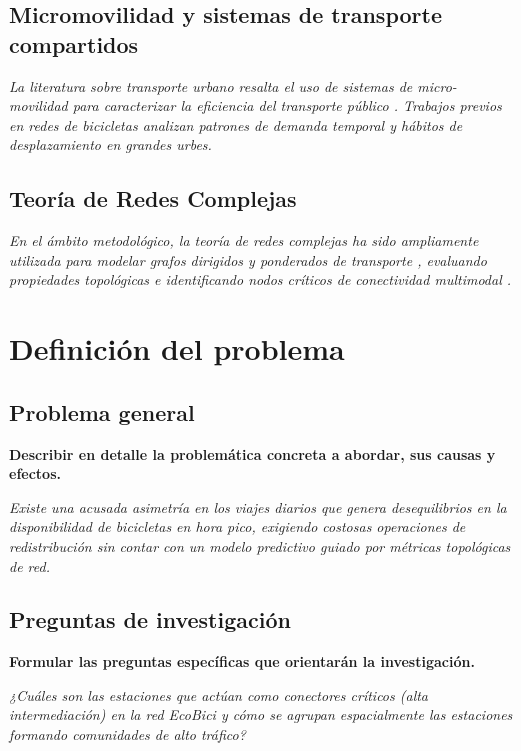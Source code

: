 \documentclass[12pt, a4paper]{article}
\begin{document}
\subsection{Micromovilidad y sistemas de transporte compartidos}
\noindent \textit{La literatura sobre transporte urbano resalta el uso de sistemas de micro-movilidad para caracterizar la eficiencia del transporte público \cite{gonzalez2022ecobici}. Trabajos previos en redes de bicicletas analizan patrones de demanda temporal y hábitos de desplazamiento en grandes urbes.}

\subsection{Teoría de Redes Complejas}
\noindent \textit{En el ámbito metodológico, la teoría de redes complejas ha sido ampliamente utilizada para modelar grafos dirigidos y ponderados de transporte \cite{newman2018networks}, evaluando propiedades topológicas e identificando nodos críticos de conectividad multimodal \cite{rodriguez2021complex}.}

\section{Definición del problema}

\subsection{Problema general}
\textbf{Describir en detalle la problemática concreta a abordar, sus causas y efectos.}

\vspace{0.2cm}
\noindent \textit{Existe una acusada asimetría en los viajes diarios que genera desequilibrios en la disponibilidad de bicicletas en hora pico, exigiendo costosas operaciones de redistribución sin contar con un modelo predictivo guiado por métricas topológicas de red.}

\subsection{Preguntas de investigación}
\textbf{Formular las preguntas específicas que orientarán la investigación.}

\vspace{0.2cm}
\noindent \textit{¿Cuáles son las estaciones que actúan como conectores críticos (alta intermediación) en la red EcoBici y cómo se agrupan espacialmente las estaciones formando comunidades de alto tráfico?}
\end{document}
